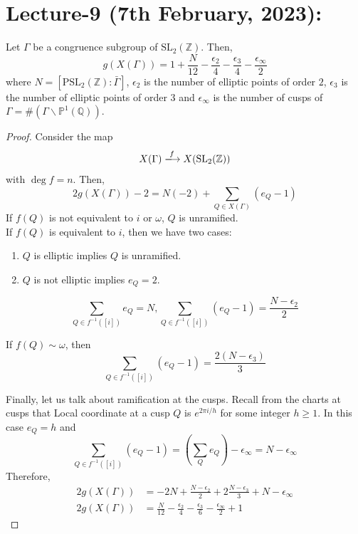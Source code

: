 \documentclass[oneside, 12pt, ]{scrbook}
\newcommand{\QQ}{\mathbb Q}
\newcommand{\ZZ}{\mathbb Z}
\newcommand{\PP}{\mathbb{P}}
\newcommand{\SL}{\mathrm{SL}}
\newcommand{\bs}{\backslash}
\theoremstyle{theorem}
\begin{document}
\chapter{Lecture-9 (7th February, 2023): }

\begin{corollary}
Let $\Gamma$ be a congruence subgroup of $\SL_{2}(\ZZ)$. Then, $$g(X(\Gamma)) = 1 + \frac{N}{12} - \frac{\epsilon_{2}}{4} - \frac{\epsilon_{3}}{4} - \frac{\epsilon_{\infty}}{2}$$ where $N = [\mathrm{PSL}_{2}(\ZZ): \bar{\Gamma}]$, $\epsilon_{2}$ is the number of elliptic points of order $2$, $\epsilon_{3}$ is the number of elliptic points of order $3$ and $\epsilon_{\infty}$ is the number of cusps of $\Gamma = \#(\Gamma \bs \PP^{1}(\QQ))$.
\end{corollary}

\begin{proof}
Consider the map $$X(\Gamma) \xlongrightarrow{f} X(\SL_{2}(\ZZ))$$ with $\deg f = n$. Then, $$2g(X(\Gamma)) -2 = N(-2) + \sum_{Q \in X(\Gamma)} (e_{Q}-1)$$
If $f(Q)$ is not equivalent to $i$ or $\omega$, $Q$ is unramified. \\

If $f(Q)$ is equivalent to $i$, then we have two cases: 
\begin{enumerate}
\item $Q$ is elliptic implies $Q$ is unramified.
\item $Q$ is not elliptic implies $e_{Q}=2$.
\end{enumerate}
$$\sum_{Q \in f^{-1}([i])} e_{Q}=N , \sum_{Q \in f^{-1}([i])} (e_{Q}-1) = \frac{N-\epsilon_{2}}{2}$$

If $f(Q) \sim \omega$, then $$\sum_{Q \in f^{-1}([i])} (e_{Q}-1) = \frac{2(N-\epsilon_{3})}{3}$$

Finally, let us talk about ramification at the cusps. Recall from the charts at cusps that Local coordinate at a cusp $Q$ is $e^{2\pi i /h}$ for some integer $h \geq 1$. In this case $e_{Q}=h$ and $$\sum_{Q \in f^{-1}([i])} (e_{Q}-1) = \left(\sum_{Q}e_{Q}\right) - \epsilon_{\infty} = N - \epsilon_{\infty}$$
Therefore, 
\begin{align*}
2g(X(\Gamma)) &= -2N + \frac{N - \epsilon_{2}}{2} + 2\frac{N-\epsilon_{3}}{3} + N -\epsilon_{\infty} \\
2g(X(\Gamma)) &= \frac{N}{12} - \frac{\epsilon_{2}}{4} - \frac{\epsilon_{3}}{6} - \frac{\epsilon_{\infty}}{2} + 1
\end{align*}
\end{proof}
\end{document}

